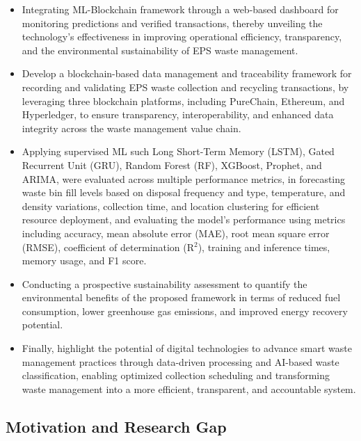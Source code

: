 \documentclass[final,5p,times,twocolumn]{elsarticle}
\begin{document}
\begin{itemize}
\item Integrating ML-Blockchain framework through a web-based dashboard for monitoring predictions and verified transactions, thereby unveiling the technology's effectiveness in improving operational efficiency, transparency, and the environmental sustainability of EPS waste management.
\item Develop a blockchain-based data management and traceability framework for recording and validating EPS waste collection and recycling transactions, by leveraging three blockchain platforms, including PureChain, Ethereum, and Hyperledger, to ensure transparency, interoperability, and enhanced data integrity across the waste management value chain.
\item Applying supervised ML such Long Short-Term Memory (LSTM), Gated Recurrent Unit (GRU), Random Forest (RF), XGBoost, Prophet, and ARIMA, were evaluated across multiple performance metrics, in forecasting waste bin fill levels based on disposal frequency and type, temperature, and density variations, collection time, and location clustering for efficient resource deployment, and evaluating the model's performance using metrics including accuracy, mean absolute error (MAE), root mean square error (RMSE), coefficient of determination (R$^2$), training and inference times, memory usage, and F1 score.
\item Conducting a prospective sustainability assessment to quantify the environmental benefits of the proposed framework in terms of reduced fuel consumption, lower greenhouse gas emissions, and improved energy recovery potential.
\item Finally, highlight the potential of digital technologies to advance smart waste management practices through data-driven processing and AI-based waste classification, enabling optimized collection scheduling and transforming waste management into a more efficient, transparent, and accountable system.
\end{itemize}

\subsection{Motivation and Research Gap}
\end{document}
